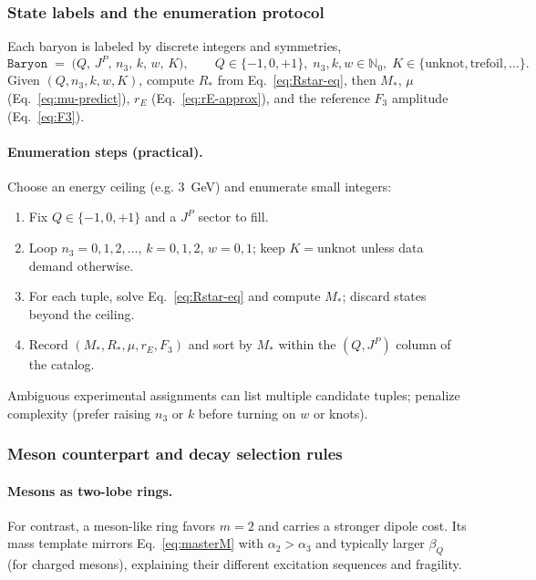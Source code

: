 \subsubsection{State labels and the enumeration protocol}
\label{sec:baryons-phenomenology:catalog}

Each baryon is labeled by discrete integers and symmetries,
\begin{equation}
\texttt{Baryon}\;=\;\big(Q,\,J^P,\,n_3,\,k,\,w,\,K\big),
\qquad Q\in\{-1,0,+1\},\; n_3,k,w\in\mathbb N_0,\; K\in\{\text{unknot},\text{trefoil},\dots\}.
\label{eq:tuple}
\end{equation}
Given $(Q,n_3,k,w,K)$, compute $R_\ast$ from Eq.~\eqref{eq:Rstar-eq}, then $M_\ast$, $\mu$ (Eq.~\eqref{eq:mu-predict}), $r_E$ (Eq.~\eqref{eq:rE-approx}), and the reference $F_3$ amplitude (Eq.~\eqref{eq:F3}).

\paragraph{Enumeration steps (practical).}
Choose an energy ceiling (e.g. 3~GeV) and enumerate small integers:
\begin{enumerate}\setlength\itemsep{2pt}
\item Fix $Q\in\{-1,0,+1\}$ and a $J^P$ sector to fill.
\item Loop $n_3=0,1,2,\dots$, $k=0,1,2$, $w=0,1$; keep $K=\text{unknot}$ unless data demand otherwise.
\item For each tuple, solve Eq.~\eqref{eq:Rstar-eq} and compute $M_\ast$; discard states beyond the ceiling.
\item Record $(M_\ast,R_\ast,\mu,r_E,F_3)$ and sort by $M_\ast$ within the $(Q,J^P)$ column of the catalog.
\end{enumerate}
Ambiguous experimental assignments can list multiple candidate tuples; penalize complexity (prefer raising $n_3$ or $k$ before turning on $w$ or knots).

\subsubsection{Meson counterpart and decay selection rules}
\label{sec:baryons-phenomenology:meson-decay}

\paragraph{Mesons as two-lobe rings.}
For contrast, a meson-like ring favors $m{=}2$ and carries a stronger dipole cost. Its mass template mirrors Eq.~\eqref{eq:masterM} with $\alpha_2>\alpha_3$ and typically larger $\beta_Q$ (for charged mesons), explaining their different excitation sequences and fragility.

